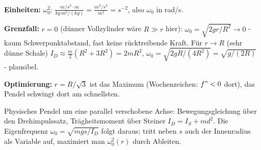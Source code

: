 \begin{kontrolle}
\textbf{Einheiten:} $\omega_0^2$:
$\frac{m/s^2\cdot m}{kg\,m^2/(kg)}=\frac{m^2/s^2}{m^2}=s^{-2}$, also $\omega_0$
in rad/s. \checkmark

\textbf{Grenzfall:} $r=0$ (dünner Vollzylinder wäre $R\gg r$ hier): $\omega_0
=\sqrt{2gr/R^2}\to 0$ - kaum Schwerpunktabstand, fast keine rücktreibende
Kraft. Für $r\to R$ (sehr dünne Schale) $I_D\approx\frac m2(R^2+3R^2)=2mR^2$,
$\omega_0=\sqrt{2gR/(4R^2)}=\sqrt{g/(2R)}$ - plausibel.

\textbf{Optimierung:} $r=R/\sqrt3$ ist das Maximum (Wochenzeichen: $f"<0$
dort), das Pendel schwingt dort am schnellsten.
\end{kontrolle}

\begin{merksatz}
Physisches Pendel um eine parallel verschobene Achse: Bewegungsgleichung
über den Drehimpulssatz, Trägheitsmoment über Steiner $I_D=I_S+md^2$. Die
Eigenfrequenz $\omega_0=\sqrt{mgs/I_D}$ folgt daraus; tritt neben $s$ auch
der Innenradius als Variable auf, maximiert man $\omega_0^2(r)$ durch Ableiten.
\end{merksatz}